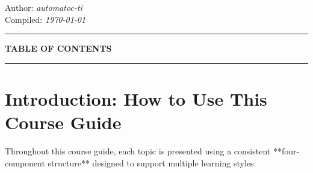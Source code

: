 \documentclass[12pt, a4paper, openright]{report}
\newcommand{\CompileDate}{\today}
\newcommand{\NoteAuthor}{automatoc-ti}
\begin{document}
\vfill

\begin{center}
  {\small\color{white!50}Author: \textit{\NoteAuthor}}\\[0.3em]
  {\small\color{white!50}Compiled: \textit{\CompileDate}}
\end{center}

\clearpage
\pagestyle{fancy}

\begin{center}
  {\color{StarGold}\rule{0.4\textwidth}{0.5pt}}
\end{center}

\vspace{0.8cm}

{\centering\Large\bfseries\color{DeepSpace}TABLE OF CONTENTS\par}

\vspace{0.8cm}

\begin{center}
  {\color{StarGold}\rule{0.4\textwidth}{0.5pt}}
\end{center}

\vspace{1.2cm}

{%
  \hypersetup{linkcolor=DeepSpace}%
  \renewcommand{\contentsname}{}%
  \tableofcontents
}

\clearpage



\chapter*{Introduction: How to Use This Course Guide}

Throughout this course guide, each topic is presented using a consistent
**four-component structure** designed to support multiple learning styles:

\bigskip
\end{document}
